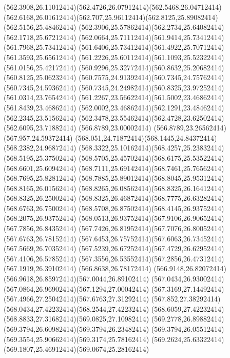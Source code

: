 {{	\curveto(562.3908,26.11012414)(562.4726,26.07912414)(562.5468,26.04712414)
	\curveto(562.6168,26.01612414)(562.707,25.96112414)(562.8125,25.89082414)
	\lineto(562.5156,25.48462414)
	\curveto(562.3906,25.57862414)(562.2734,25.64082414)(562.1718,25.67212414)
	\curveto(562.0664,25.71112414)(561.9414,25.73412414)(561.7968,25.73412414)
	\curveto(561.6406,25.73412414)(561.4922,25.70712414)(561.3593,25.65612414)
	\curveto(561.2226,25.60112414)(561.1093,25.52322414)(561.0156,25.42172414)
	\curveto(560.9296,25.32772414)(560.8632,25.20682414)(560.8125,25.06232414)
	\curveto(560.7575,24.91392414)(560.7345,24.75762414)(560.7345,24.59362414)
	\curveto(560.7345,24.24982414)(560.8325,23.97252414)(561.0314,23.76542414)
	\curveto(561.2267,23.56622414)(561.5002,23.46862414)(561.8439,23.46862414)
	\curveto(562.0002,23.46862414)(562.1291,23.48462414)(562.2345,23.51562414)
	\curveto(562.3478,23.55462414)(562.4728,23.62502414)(562.6095,23.71882414)
	\closepath
	\moveto(566.8789,23.00002414)
	\lineto(566.8789,23.26562414)
	\lineto(567.957,24.59372414)
	\curveto(568.051,24.71872414)(568.1445,24.84372414)(568.2382,24.96872414)
	\curveto(568.3322,25.10162414)(568.4257,25.23832414)(568.5195,25.37502414)
	\curveto(568.5705,25.45702414)(568.6175,25.53522414)(568.6601,25.60942414)
	\curveto(568.7111,25.69142414)(568.7461,25.76562414)(568.7695,25.82812414)
	\curveto(568.7885,25.89012414)(568.8045,25.95312414)(568.8165,26.01562414)
	\curveto(568.8265,26.08562414)(568.8325,26.16412414)(568.8325,26.25002414)
	\curveto(568.8325,26.46872414)(568.7775,26.63282414)(568.6763,26.75002414)
	\curveto(568.5708,26.87502414)(568.4145,26.93752414)(568.2075,26.93752414)
	\curveto(568.0513,26.93752414)(567.9106,26.90652414)(567.7856,26.84352414)
	\curveto(567.7426,26.81952414)(567.7076,26.80052414)(567.6763,26.78152414)
	\curveto(567.6453,26.75752414)(567.6063,26.73452414)(567.5669,26.70352414)
	\curveto(567.5239,26.67252414)(567.4729,26.62952414)(567.4106,26.57852414)
	\curveto(567.3556,26.53552414)(567.2856,26.47312414)(567.1919,26.39102414)
	\lineto(566.8638,26.78172414)
	\curveto(566.9148,26.82072414)(566.9618,26.85972414)(567.0044,26.89102414)
	\curveto(567.0434,26.93002414)(567.0864,26.96902414)(567.1294,27.00042414)
	\curveto(567.3169,27.14492414)(567.4966,27.25042414)(567.6763,27.31292414)
	\curveto(567.852,27.38292414)(568.0434,27.42232414)(568.2544,27.42232414)
	\curveto(568.6059,27.42232414)(568.8833,27.31682414)(569.0825,27.10982414)
	\curveto(569.2778,26.89882414)(569.3794,26.60982414)(569.3794,26.23482414)
	\curveto(569.3794,26.05512414)(569.3554,25.90662414)(569.3174,25.78162414)
	\curveto(569.2624,25.63322414)(569.1807,25.46912414)(569.0674,25.28162414)
}}
